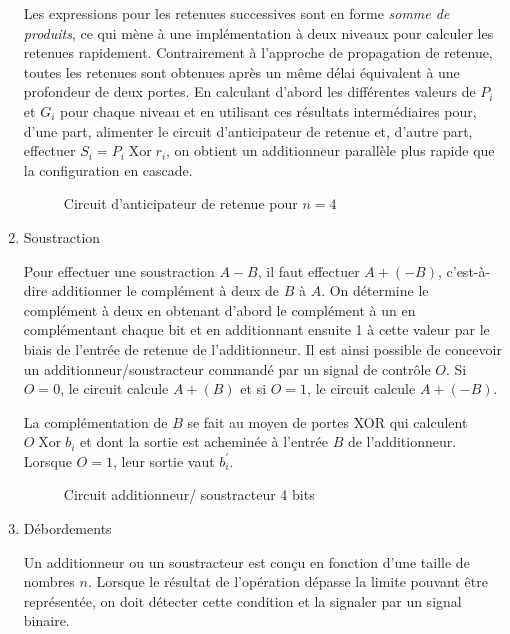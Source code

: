 \documentclass[letter, oneside]{book}
\begin{document}
\begin{enumerate}
Les expressions pour les retenues successives sont en forme \emph{somme de
produits}, ce qui mène à une implémentation à deux niveaux pour
calculer les retenues rapidement. Contrairement à l'approche de
propagation de retenue, toutes les retenues sont obtenues après un
même délai équivalent à une profondeur de deux portes.  En calculant
d'abord les différentes valeurs de \(P_i\) et \(G_i\) pour chaque
niveau et en utilisant ces résultats intermédiaires pour, d'une part,
alimenter le circuit d'anticipateur de retenue et, d'autre part,
effectuer \(S_i = P_i  \operatorname{Xor} r_i\), on obtient un additionneur parallèle
plus rapide que la configuration en cascade.

\begin{figure}[htbp]
\centering

\caption{\label{fig:org5685442}Circuit d'anticipateur de retenue pour \(n= 4\)}
\end{figure}


\item Soustraction
\label{sec:org2af545e}

Pour effectuer une soustraction \(A - B\), il faut effectuer \(A +
(-B)\), c'est-à-dire additionner le complément à deux de \(B\) à
\(A\). On détermine le complément à deux en obtenant d'abord le
complément à un en complémentant chaque bit et en additionnant ensuite
1 à cette valeur par le biais de l'entrée de retenue de l'additionneur. Il
est ainsi possible de concevoir un additionneur/soustracteur commandé
par un signal de contrôle \(O\). Si \(O=0\), le circuit calcule \(A +
(B)\) et si \(O=1\), le circuit calcule \(A + (-B)\).

La complémentation de \(B\) se fait au moyen de portes XOR qui
calculent \(O \operatorname{Xor} b_i\) et dont la sortie est acheminée
à l'entrée \(B\) de l'additionneur. Lorsque \(O=1\), leur sortie vaut
\(b_i^\prime\).

\begin{figure}[htbp]
\centering

\caption{\label{fig:org7cb03ed}Circuit additionneur/ soustracteur 4 bits}
\end{figure}

\item Débordements
\label{sec:orgba948d3}

Un additionneur ou un soustracteur est conçu en fonction d'une
taille de nombres \(n\). Lorsque le résultat de l'opération dépasse la
limite pouvant être représentée, on doit détecter cette condition et
la signaler par un signal binaire.


\end{enumerate}
\end{document}
